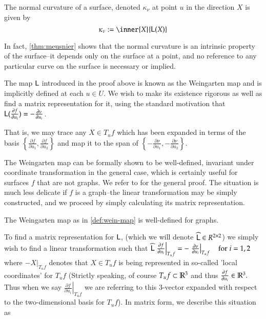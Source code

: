 	\begin{defn} \label{def:normal-curvature}
		The normal curvature of a surface, denoted $\kappa_\nu$ at point $u$ in the direction $X$ is given by
		\[\kappa_\nu :=  \inner{X}{\wein(X)} \]
	\end{defn}
	In fact, \cref{thm:meusnier} shows that the normal curvature is an intrinsic property of the surface--it depends only on the
	surface at a point, and no reference to any particular curve on the surface is necessary or implied.
	
	
	The map $\mathsf{L}$ introduced in the proof above is known as the Weingarten map
	and is implicitly defined at each $u \in U$. 
	We wish to make its existence rigorous as well as find a matrix representation for it, using the standard motivation that $\mathsf{L}(\frac{\partial f}{\partial u_i}) = - \frac{\partial \nu}{\partial u_i}$.
	
	
	That is, we may trace any $X \in T_u f$ which has been expanded in terms of the basis 
	$\left\{\frac{\partial f}{\partial u_1} , \frac{\partial f}{\partial u_2}\right\}$
	and map it to the span of $\left\{-\frac{\partial \nu}{\partial u_1} , -\frac{\partial \nu}{\partial u_2}\right\}$. 
	
	The Weingarten map can be formally shown to be well-defined, invariant under coordinate transformation in the general case, which is certainly useful for surfaces $f$ that are not graphs. We refer to \cite{Kuhnel-DiffGeo} for the general proof. The situation is much less delicate if $f$ is a graph--the linear transformation may be simply constructed, and we proceed by simply calculating its matrix representation.	
	\begin{lemma}
		The Weingarten map as in \cref{def:wein-map} is well-defined for graphs.
	\end{lemma}
	To find a matrix representation for $\mathsf{L}$, (which we will denote $\widehat{\mathsf{L}} \in R^{2\times2}$) we simply wish to find a linear transformation
	such that
	$\widehat{\mathsf{L}} \left.\frac{\partial f}{\partial u_i}\right|_{T_u f}
		= - \left.\frac{\partial \nu}{\partial u_i}\right|_{T_u f} \quad \textrm{for} \; i=1,2$
			where $- \left.X\right|_{T_u f}$ denotes that $X \in T_u f$ is being represented in so-called
	'local coordinates' for $T_u f$ (Strictly speaking, of course $T_u f \subset \mathbb{R}^3$ and thus
	$\frac{\partial f}{\partial u_i} \in \mathbb{R}^3.$ Thus when we say $ \left.\frac{\partial f}{\partial u_i}\right|_{T_u f}$ we are referring to this 3-vector expanded with respect to the two-dimensional basis for $T_u f$). In matrix form, we describe this situation as
	
